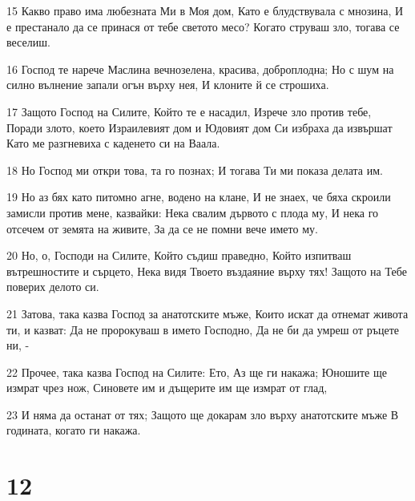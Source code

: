 \par 15 Какво право има любезната Ми в Моя дом, Като е блудствувала с мнозина, И е престанало да се принася от тебе светото месо? Когато струваш зло, тогава се веселиш.
\par 16 Господ те нарече Маслина вечнозелена, красива, доброплодна; Но с шум на силно вълнение запали огън върху нея, И клоните й се строшиха.
\par 17 Защото Господ на Силите, Който те е насадил, Изрече зло против тебе, Поради злото, което Израилевият дом и Юдовият дом Си избраха да извършат Като ме разгневиха с каденето си на Ваала.
\par 18 Но Господ ми откри това, та го познах; И тогава Ти ми показа делата им.
\par 19 Но аз бях като питомно агне, водено на клане, И не знаех, че бяха скроили замисли против мене, казвайки: Нека свалим дървото с плода му, И нека го отсечем от земята на живите, За да се не помни вече името му.
\par 20 Но, о, Господи на Силите, Който съдиш праведно, Който изпитваш вътрешностите и сърцето, Нека видя Твоето въздаяние върху тях! Защото на Тебе поверих делото си.
\par 21 Затова, така казва Господ за анатотските мъже, Които искат да отнемат живота ти, и казват: Да не пророкуваш в името Господно, Да не би да умреш от ръцете ни, -
\par 22 Прочее, така казва Господ на Силите: Ето, Аз ще ги накажа; Юношите ще измрат чрез нож, Синовете им и дъщерите им ще измрат от глад,
\par 23 И няма да останат от тях; Защото ще докарам зло върху анатотските мъже В годината, когато ги накажа.

\chapter{12}

